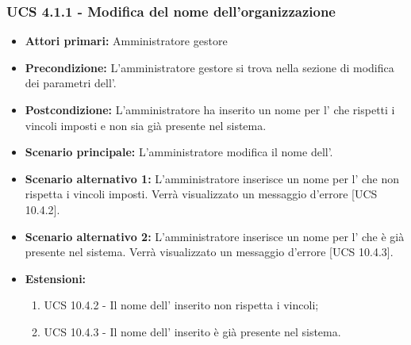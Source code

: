 \subsubsection{UCS 4.1.1 - Modifica del nome dell'organizzazione}%
\begin{itemize}
	\item \textbf{Attori primari:} Amministratore gestore
	\item \textbf{Precondizione:} L'amministratore gestore si trova nella sezione di modifica dei parametri dell'.
	\item \textbf{Postcondizione:} L'amministratore ha inserito un nome per l' che rispetti i vincoli imposti e non sia già presente nel sistema.
	\item \textbf{Scenario principale:} L'amministratore modifica il nome dell'.
	\item \textbf{Scenario alternativo 1:} L'amministratore inserisce un nome per l' che non rispetta i vincoli imposti. Verrà visualizzato un messaggio d'errore [UCS 10.4.2].
	\item \textbf{Scenario alternativo 2:} L'amministratore inserisce un nome per l' che è già presente nel sistema. Verrà visualizzato un messaggio d'errore [UCS 10.4.3].
	\item \textbf{Estensioni:}
	\begin{enumerate}
		\item UCS 10.4.2 - Il nome dell' inserito non rispetta i vincoli;
		\item UCS 10.4.3 - Il nome dell' inserito è già presente nel sistema.
	\end{enumerate}
\end{itemize}


